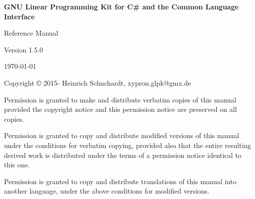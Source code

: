 \documentclass[a4paper,11pt]{report}
\newcommand{\glpkCliVersion}{1.5.0}
\begin{document}

\thispagestyle{empty}

\begin{center}

\vspace*{1in}

\begin{huge}
\sf\bfseries GNU Linear Programming Kit\linebreak
for C\# and the Common Language Interface
\end{huge}

\vspace{0.5in}

\begin{LARGE}
\sf Reference Manual
\end{LARGE}

\vspace{0.5in}

\begin{LARGE}
\sf Version \glpkCliVersion
\end{LARGE}

\vspace{0.5in}
\begin{Large}
\sf \today
\end{Large}
\end{center}

\newpage

\vspace*{1in}

\vfill

\medskip \noindent
Copyright \copyright{} 2015-{\the\year} Heinrich Schuchardt,
xypron.glpk@gmx.de

\medskip \noindent
Permission is granted to make and distribute verbatim copies of this
manual provided the copyright notice and this permission notice are
preserved on all copies.

\medskip \noindent
Permission is granted to copy and distribute modified versions of this
manual under the conditions for verbatim copying, provided also that the
entire resulting derived work is distributed under the terms of
a permission notice identical to this one.

\medskip \noindent
Permission is granted to copy and distribute translations of this manual
into another language, under the above conditions for modified versions.
\end{document}
